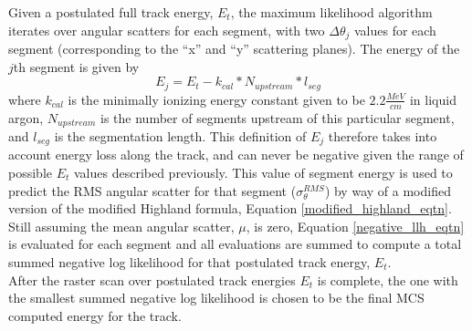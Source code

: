 Given a postulated full track energy, $E_t$, the maximum likelihood algorithm iterates over angular scatters for each segment, with two $\Delta\theta_j$ values for each segment (corresponding to the ``x'' and ``y'' scattering planes). The energy of the $j$th segment is given by
\begin{equation}\label{segment_E_equation}
E_{j} = E_t - k_{cal}*N_{upstream}*l_{seg}
\end{equation}
where $k_{cal}$ is the minimally ionizing energy constant given to be $2.2 \frac{MeV}{cm}$ in liquid argon, $N_{upstream}$ is the number of segments upstream of this particular segment, and $l_{seg}$ is the segmentation length. This definition of $E_j$ therefore takes into account energy loss along the track, and can never be negative given the range of possible $E_t$ values described previously. This value of segment energy is used to predict the RMS angular scatter for that segment ($\sigma_\theta^{RMS}$) by way of a modified version of the modified Highland formula, Equation \ref{modified_highland_eqtn}. Still assuming the mean angular scatter, $\mu$, is zero, Equation \ref{negative_llh_eqtn} is evaluated for each segment and all evaluations are summed to compute a total summed negative log likelihood for that postulated track energy, $E_t$.\\

After the raster scan over postulated track energies $E_t$ is complete, the one with the smallest summed negative log likelihood is chosen to be the final MCS computed energy for the track.















